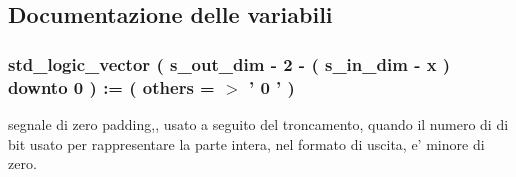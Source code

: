 \subsection{Documentazione delle variabili}
\hypertarget{group___truncation_ga130836df2917c4b75d1fc24500082e76}{
\subsubsection[{padding\+\_\+neg}]{ {\bfseries \textcolor{vhdlchar}{std\+\_\+logic\+\_\+vector}\textcolor{vhdlchar}{ }\textcolor{vhdlchar}{(}\textcolor{vhdlchar}{ }\textcolor{vhdlchar}{ }\textcolor{vhdlchar}{ }\textcolor{vhdlchar}{ }{\bfseries {\bf s\+\_\+out\+\_\+dim}} \textcolor{vhdlchar}{-\/}\textcolor{vhdlchar}{ } \textcolor{vhdldigit}{2} \textcolor{vhdlchar}{-\/}\textcolor{vhdlchar}{ }\textcolor{vhdlchar}{(}\textcolor{vhdlchar}{ }\textcolor{vhdlchar}{ }\textcolor{vhdlchar}{ }\textcolor{vhdlchar}{ }{\bfseries {\bf s\+\_\+in\+\_\+dim}} \textcolor{vhdlchar}{-\/}\textcolor{vhdlchar}{ }\textcolor{vhdlchar}{ }\textcolor{vhdlchar}{ }{\bfseries {\bf x}} \textcolor{vhdlchar}{ }\textcolor{vhdlchar}{)}\textcolor{vhdlchar}{ }\textcolor{vhdlchar}{ }\textcolor{vhdlchar}{downto}\textcolor{vhdlchar}{ }\textcolor{vhdlchar}{ } \textcolor{vhdldigit}{0} \textcolor{vhdlchar}{ }\textcolor{vhdlchar}{)}\textcolor{vhdlchar}{ }\textcolor{vhdlchar}{ }\textcolor{vhdlchar}{ }\textcolor{vhdlchar}{\+:}\textcolor{vhdlchar}{=}\textcolor{vhdlchar}{ }\textcolor{vhdlchar}{(}\textcolor{vhdlchar}{ }\textcolor{vhdlchar}{ }\textcolor{vhdlchar}{others}\textcolor{vhdlchar}{ }\textcolor{vhdlchar}{ }\textcolor{vhdlchar}{=}\textcolor{vhdlchar}{ }\textcolor{vhdlchar}{$>$}\textcolor{vhdlchar}{ }\textcolor{vhdlchar}{'}\textcolor{vhdlchar}{ } \textcolor{vhdldigit}{0} \textcolor{vhdlchar}{ }\textcolor{vhdlchar}{'}\textcolor{vhdlchar}{ }\textcolor{vhdlchar}{)}\textcolor{vhdlchar}{ }} \hspace{0.3cm}{\ttfamily [Signal]}}}\label{group___truncation_ga130836df2917c4b75d1fc24500082e76}


segnale di zero padding,, usato a seguito del troncamento, quando il numero di di bit usato per rappresentare la parte intera, nel formato di uscita, e' minore di zero. 

